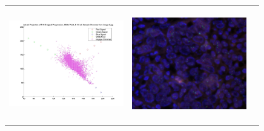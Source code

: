 \begin{tabular}{ |c|c|c| }
\includegraphics[width=5.0cm,height=5.0cm]{images/Her2Fish/2_SampleChromas.jpg}   &
\includegraphics[width=5.0cm,height=5.0cm]{images/Her2Fish/3.jpg}
\end{tabular}


